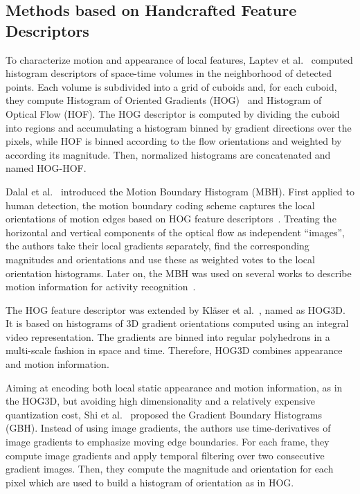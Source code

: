 \documentclass[10pt,conference]{IEEEtran}
\begin{document}
\subsection{Methods based on Handcrafted Feature Descriptors}\label{handcrafted}


To characterize motion and appearance of local features, Laptev et al.~\cite{Laptev:2008} computed histogram descriptors of space-time volumes in the neighborhood of detected points. Each volume is subdivided into a grid of cuboids and, for each cuboid, they compute Histogram of Oriented Gradients (HOG)~\cite{Dalal:2005} and Histogram of Optical Flow (HOF). The HOG descriptor is computed by dividing the cuboid into regions and accumulating a histogram binned by gradient directions over the pixels, while HOF is binned according to the flow orientations and weighted by according its magnitude. Then, normalized histograms are concatenated and named HOG-HOF.

Dalal et al.~\cite{Dalal:2006} introduced the Motion Boundary Histogram (MBH). First applied to human detection, the motion boundary coding scheme captures the local orientations of motion edges based on HOG feature descriptors~\cite{Dalal:2005}. Treating the horizontal and vertical components of the optical flow as independent ``images'', the authors take their local gradients separately, find the corresponding magnitudes and orientations and use these as weighted votes to the local orientation histograms. Later on, the MBH was used on several works to describe motion information for activity recognition~\cite{Laptev:2008, Wang:2011, Wang:2013}.

The HOG feature descriptor was extended by Kl\"{a}ser et al.~\cite{Klaser:2008}, named as HOG3D. It is based on histograms of 3D gradient orientations computed using an integral video representation. The gradients are binned into regular polyhedrons in a multi-scale fashion in space and time. Therefore, HOG3D combines appearance and motion information.

Aiming at encoding both local static appearance and motion information, as in the HOG3D, but avoiding high dimensionality and a relatively expensive quantization cost, Shi et al.~\cite{Shi:2015} proposed the Gradient Boundary Histograms (GBH). Instead of using image gradients, the authors use time-derivatives of image gradients to emphasize moving edge boundaries. For each frame, they compute image gradients and apply temporal filtering over two consecutive gradient images. Then, they compute the magnitude and orientation for each pixel which are used to build a histogram of orientation as in HOG.
\end{document}
